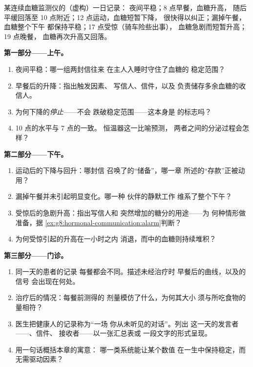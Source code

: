 \begin{problem}\label{pb:g8:hormonal-communication:1}
某连续血糖监测仪的（虚构）一日记录：
夜间平稳；8 点早餐，血糖升高，
随后平缓回落至 10 点附近；12 点运动，血糖短暂下降，
很快得以纠正；漏掉午餐，血糖整个下午
都保持平稳；17 点受惊（骑车险些出事），
血糖急剧而短暂升高；19 点晚餐，
血糖再次升高又回落。

\medskip\noindent\textbf{第一部分——上午。}
\begin{enumerate}
  \item 夜间平稳：哪一组两封信往来
        在主人入睡时守住了血糖的
        稳定范围？
  \item 早餐后的升降：指出触发因素、
        写信人、信件，以及
        负责储存多余血糖的收信人。
  \item 为何下降的\emph{停止}——不会
        跌破稳定范围——这本身是
        的标志吗？
  \item 10 点的水平与 7 点的一致。
        恒温器这一比喻预测，
        两者之间的分泌过程会怎样？
\end{enumerate}

\medskip\noindent\textbf{第二部分——下午。}
\begin{enumerate}[resume]
  \item 运动后的下降与回升：哪封信
        召唤了的“储备”，哪一章
        所述的“存款”正被动用？
  \item 漏掉午餐并未引起明显变化。哪一种
        伙伴的静默工作
        维系了整个下午？
  \item 受惊后的急剧升高：指出写信人和
        突然增加的糖分的用途——为
        何种情形做准备，据
        \cref{ex:g8:hormonal-communication:alarm}判断？
  \item 为何受惊引起的升高在一小时之内
        消退，而中的血糖则持续堆积？
\end{enumerate}

\medskip\noindent\textbf{第三部分——门诊。}
\begin{enumerate}[resume]
  \item 同一天的患者的记录
        每餐都会不同。描述未经治疗时
        早餐后的曲线，以及的信号
        会出现在何处。
  \item 治疗后的情况：每餐前测得的
        剂量模仿了什么，为何其大小
        须与所吃食物的量相符？
  \item 医生把健康人的记录称为“一场
        你从未听见的对话”。列出
        这一天的发言者——、信件、
        接收者——以一张汇总表或
        一段文字的形式呈现。
  \item 用一句话概括本章的寓意：
        哪一类系统能让某个数值
        在一生中保持稳定，而无需驱动因素？
\end{enumerate}
\end{problem}

